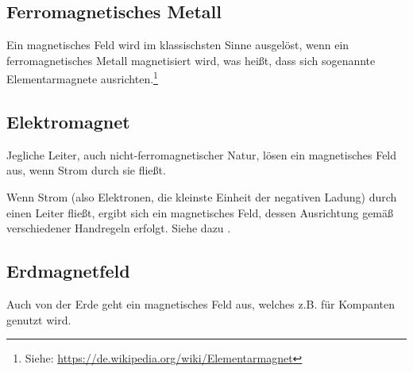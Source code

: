 \subsection{Ferromagnetisches Metall}

Ein magnetisches Feld wird im klassischsten Sinne ausgelöst, wenn ein ferromagnetisches Metall \glqq magnetisiert\grqq{} wird, was heißt, dass sich sogenannte Elementarmagnete ausrichten.\footnote{Siehe: \url{https://de.wikipedia.org/wiki/Elementarmagnet}}


\subsection{Elektromagnet}

Jegliche Leiter, auch nicht-ferromagnetischer Natur, lösen ein magnetisches Feld aus, wenn Strom durch sie fließt.

Wenn Strom (also Elektronen, die kleinste Einheit der negativen Ladung) durch einen Leiter fließt, ergibt sich ein magnetisches Feld, dessen Ausrichtung gemäß verschiedener Handregeln erfolgt. Siehe dazu .


\subsection{Erdmagnetfeld}

Auch von der Erde geht ein magnetisches Feld aus, welches z.B. für Kompanten genutzt wird.


